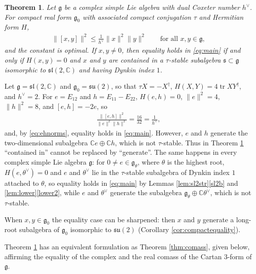 \documentclass [leqno, 10pt]{amsart}
\newtheorem{theorem}{Theorem}[section]
\theoremstyle{definition}
\numberwithin{equation}{section}
\newcommand{\su}{\mathfrak{su}}
\newcommand{\sll}{\mathfrak{sl}}
\newcommand{\g}{\mathfrak{g}}
\newcommand{\com}{\mathbb C}
\newcommand{\tr}{\operatorname{tr}}
\newcommand{\gz}{\g_{0}}
\newcommand{\hv}{h^\vee}
\newcommand{\norm}[1]{\lVert #1\rVert}
\newcommand{\subs}{\mathfrak{s}}
\begin{document}
\begin{theorem}\label{thm:A}
Let $\g$ be a complex simple Lie algebra with dual Coxeter number $\hv$. For compact real form $\gz$ with associated compact conjugation $\tau$ and Hermitian form $H$,%
\begin{align}\label{eq:main}
\norm{[x,y]}^{2} \leq \frac{1}{h^\vee}\norm{x}^{2}\norm{y}^{2} \qquad \text{for all}\,\, x, y \in \g,
\end{align}
and the constant is optimal. If $x, y \neq 0$, then equality holds in \eqref{eq:main} if and only if $H(x, y) = 0$ and $x$ and $y$ are contained in a $\tau$-stable subalgebra $\subs \subset \g$ isomorphic to $\sll(2, \com)$ and having Dynkin index $1$.
\end{theorem}

\begin{example}\label{ex:eh}
Let $\g = \sll(2, \com)$ and $\gz = \su(2)$, so that $\tau X = -X^{\dagger}$, $H(X, Y) = 4\tr XY^{\dagger}$, and $\hv = 2$. For $e = E_{12}$ and $h = E_{11} - E_{22}$, $H(e, h) = 0$, $\norm{e}^{2} = 4$, $\norm{h}^{2} = 8$, and $[e, h] = -2e$, so
\begin{align}\label{eq:ehnorms}
\frac{\norm{[e, h]}^{2}}{\norm{e}^{2}\norm{h}^{2}} = \frac{16}{32} = \frac{1}{\hv},
\end{align}
and, by \eqref{eq:ehnorms}, equality holds in \eqref{eq:main}. However, $e$ and $h$ generate the two-dimensional subalgebra $\com e \oplus \com h$, which is not $\tau$-stable. Thus in Theorem \ref{thm:A} ``contained in'' cannot be replaced by ``generate''. The same happens in every complex simple Lie algebra $\g$: for $0 \neq e \in \g_{\theta}$, where $\theta$ is the highest root, $H(e, \theta^{\vee}) = 0$ and $e$ and $\theta^{\vee}$ lie in the $\tau$-stable subalgebra of Dynkin index $1$ attached to $\theta$, so equality holds in \eqref{eq:main} by Lemmas \ref{lem:sl2str}\ref{sl2b} and \ref{lem:lower}\ref{lower2}, while $e$ and $\theta^{\vee}$ generate the subalgebra $\g_{\theta} \oplus \com\theta^{\vee}$, which is not $\tau$-stable.
\end{example}

When $x, y \in \gz$ the equality case can be sharpened: then $x$ and $y$ generate a long-root subalgebra of $\gz$ isomorphic to $\su(2)$ (Corollary \ref{cor:compactequality}). 

Theorem \ref{thm:A} has an equivalent formulation as Theorem \ref{thm:comass}, given below, affirming the equality of the complex and the real comass of the Cartan $3$-form of $\g$.
\end{document}
